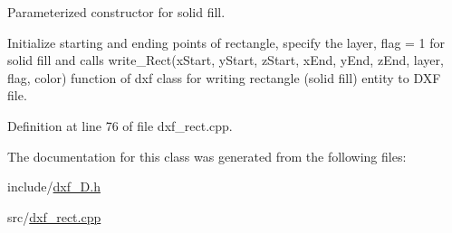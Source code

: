 Parameterized constructor for solid fill. 

Initialize starting and ending points of rectangle, specify the layer, flag = 1 for solid fill and calls write\-\_\-\-Rect(x\-Start, y\-Start, z\-Start, x\-End, y\-End, z\-End, layer, flag, color) function of dxf class for writing rectangle (solid fill) entity to D\-X\-F file. 

Definition at line 76 of file dxf\-\_\-rect.\-cpp.



The documentation for this class was generated from the following files\-:\begin{DoxyCompactItemize}
\item 
include/\hyperlink{dxf__2D_8h}{dxf\-\_\-D.\-h}\item 
src/\hyperlink{dxf__rect_8cpp}{dxf\-\_\-rect.\-cpp}\end{DoxyCompactItemize}
